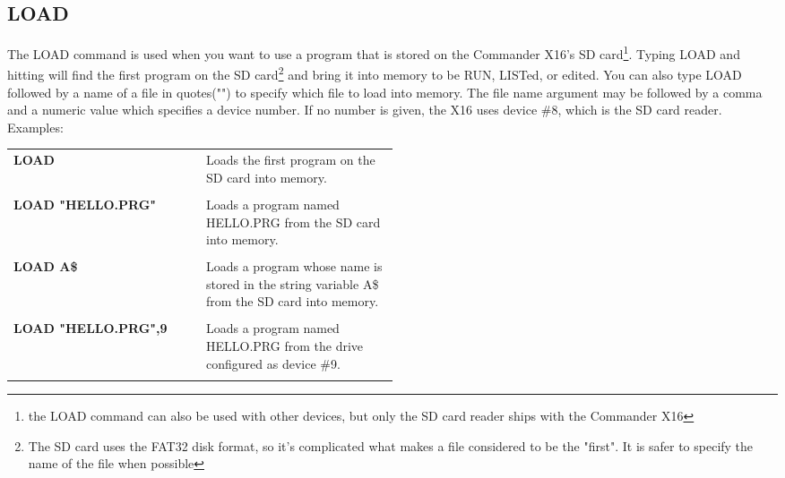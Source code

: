 \vspace{16pt}

\subsection{LOAD}

The {\ttfamily LOAD} command is used when you want to use a program that is
stored on the Commander X16's SD card\footnote{the {\ttfamily LOAD} command can
also be used with other devices, but only the SD card reader ships with the
Commander X16}.  Typing {\ttfamily LOAD} and hitting  will find
the first program on the SD card\footnote{The SD card uses the FAT32 disk
format, so it's complicated what makes a file considered to be the "first".  It
is safer to specify the name of the file when possible} and bring it into
memory to be {\ttfamily RUN}, {\ttfamily LIST}ed, or edited.  You can also type
{\ttfamily LOAD} followed by a name of a file in quotes({\ttfamily ""}) to
specify which file to load into memory.  The file name argument may be followed
by a comma and a numeric value which specifies a device number.  If no number
is given, the X16 uses device \#8, which is the SD card reader.\\

Examples:\\

\begin{tabular}{l p{0.5\linewidth}}

	{\ttfamily\bfseries LOAD}&Loads the first program on the SD card into
	memory.\\\\

	{\ttfamily\bfseries LOAD "HELLO.PRG"}&Loads a program named {\ttfamily
	HELLO.PRG} from the SD card into memory.\\\\

	{\ttfamily\bfseries LOAD A\$}&Loads a program whose name is stored in the
	string variable {\ttfamily A\$} from the SD card into memory.\\\\

	{\ttfamily\bfseries LOAD "HELLO.PRG",9}&Loads a program named {\ttfamily
	HELLO.PRG} from the drive configured as device \#9.\\\\

\end{tabular}

\vspace{16pt}

